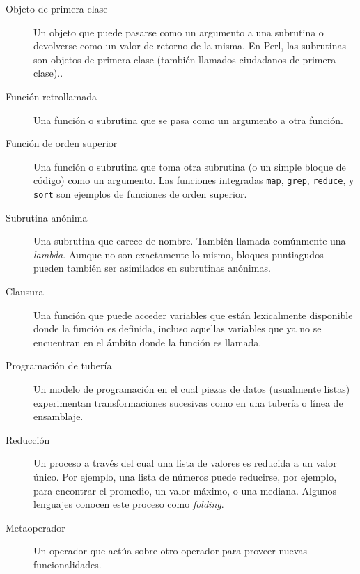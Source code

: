 \begin{description}

\item[Objeto de primera clase] Un objeto que puede
pasarse como un argumento a una subrutina o devolverse 
como un valor de retorno de la misma. En Perl, las subrutinas
son objetos de primera clase (también llamados ciudadanos de
primera clase).. 

\item[Función retrollamada] Una función o subrutina que se pasa
como un argumento a otra función.

\item[Función de orden superior] Una función o subrutina que toma
otra subrutina (o un simple bloque de código) como un 
argumento. Las funciones integradas 
{\tt map}, {\tt grep}, {\tt reduce}, y {\tt sort}
son ejemplos de funciones de orden superior.

\item[Subrutina anónima] Una subrutina que carece de nombre. 
También llamada comúnmente una \emph{lambda}. Aunque no
son exactamente lo mismo, bloques puntiagudos pueden también
ser asimilados en subrutinas anónimas.

\item[Clausura] Una función que puede acceder variables que 
están lexicalmente disponible donde la función es definida, 
incluso aquellas variables que ya no se encuentran en el
ámbito donde la función es llamada.

\item[Programación de tubería] Un modelo de programación en el
cual piezas de datos (usualmente listas) experimentan transformaciones
sucesivas como en una tubería o línea de ensamblaje.

\item[Reducción] Un proceso a través del cual una lista de valores
es reducida a un valor único. Por ejemplo, una lista de números
puede reducirse, por ejemplo, para encontrar el promedio, un valor
máximo, o una mediana. Algunos lenguajes conocen este proceso como
\emph{folding}.

\item[Metaoperador] Un operador que actúa sobre otro operador para
proveer nuevas funcionalidades.


\end{description}
